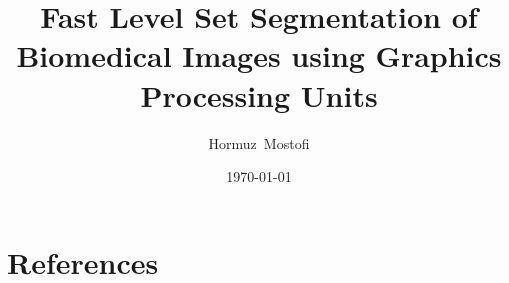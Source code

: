 \documentclass[a4paper]{report}
\begin{document}
\title{Fast Level Set Segmentation of Biomedical Images using Graphics Processing Units}
\author{Hormuz~Mostofi}
\date{\today}
\maketitle

\setcounter{tocdepth}{1}
\tableofcontents








\chapter{References}







\end{document}

